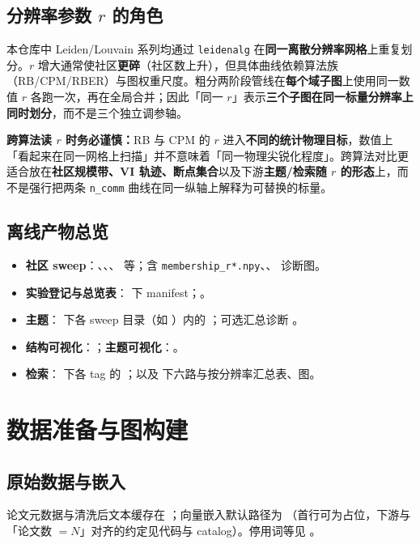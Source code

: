 \documentclass[UTF8,a4paper,11pt,fontset=fandol]{ctexart}
\begin{document}
\subsection{分辨率参数 $r$ 的角色}
本仓库中 Leiden/Louvain 系列均通过 \texttt{leidenalg} 在\textbf{同一离散分辨率网格}上重复划分。$r$ 增大通常使社区\textbf{更碎}（社区数上升），但具体曲线依赖算法族（RB/CPM/RBER）与图权重尺度。粗分两阶段管线在\textbf{每个域子图}上使用同一数值 $r$ 各跑一次，再在全局合并；因此「同一 $r$」表示\textbf{三个子图在同一标量分辨率上同时划分}，而不是三个独立调参轴。

\textbf{跨算法读 $r$ 时务必谨慎：}RB 与 CPM 的 $r$ 进入\textbf{不同的统计物理目标}，数值上「看起来在同一网格上扫描」并不意味着「同一物理尖锐化程度」。跨算法对比更适合放在\textbf{社区规模带、VI 轨迹、断点集合}以及下游\textbf{主题/检索随 $r$ 的形态}上，而不是强行把两条 \texttt{n\_comm} 曲线在同一纵轴上解释为可替换的标量。

\subsection{离线产物总览}
\begin{itemize}
  \item \textbf{社区 sweep}：、、、 等；含 \texttt{membership\_r*.npy}、、 诊断图。
  \item \textbf{实验登记与总览表}： 下 manifest；。
  \item \textbf{主题}： 下各 sweep 目录（如 ）内的 ；可选汇总诊断 。
  \item \textbf{结构可视化}：；\textbf{主题可视化}：。
  \item \textbf{检索}： 下各 tag 的 ；以及  下六路与按分辨率汇总表、图。
\end{itemize}

\section{数据准备与图构建}

\subsection{原始数据与嵌入}
论文元数据与清洗后文本缓存在 ；向量嵌入默认路径为 （首行可为占位，下游与「论文数 $=N$」对齐的约定见代码与 catalog）。停用词等见 。
\end{document}
